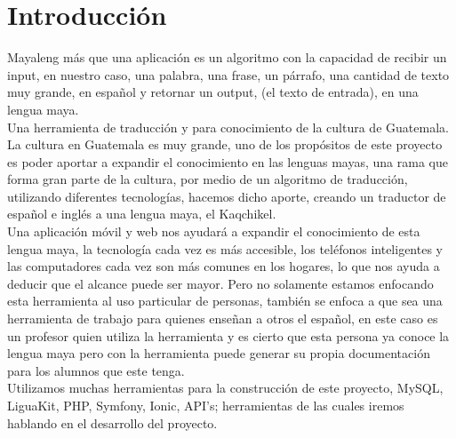 \documentclass[a4paper,openright,11pt]{article}
\begin{document}
\newpage

\tableofcontents

\cleardoublepage
\listoffigures

\cleardoublepage
\listoftables

\newpage

\pagestyle{fancy}
\section{Introducción}
Mayaleng más que una aplicación es un algoritmo con la capacidad de recibir un input, en nuestro caso, una palabra, una frase, un párrafo, una cantidad de texto muy grande, en español y retornar un output, (el texto de entrada), en una lengua maya. \\

Una herramienta de traducción y para conocimiento de la cultura de Guatemala.\\

La cultura en Guatemala es muy grande, uno de los propósitos de este proyecto es poder aportar a expandir el conocimiento en las lenguas mayas, una rama que forma gran parte de la cultura, por medio de un algoritmo de traducción, utilizando diferentes tecnologías, hacemos dicho aporte, creando un traductor de español e inglés a una lengua maya, el Kaqchikel.\\

Una aplicación móvil y web nos ayudará a expandir el conocimiento de esta lengua maya, la tecnología cada vez es más accesible, los teléfonos inteligentes y las computadores cada vez son más comunes en los hogares, lo que nos ayuda a deducir que el alcance puede ser mayor. Pero no solamente estamos enfocando esta herramienta al uso particular de personas, también se enfoca a que sea una herramienta de trabajo para quienes enseñan a otros el español, en este caso es un profesor quien utiliza la herramienta y es cierto que esta persona ya conoce la lengua maya pero con la herramienta puede generar su propia documentación para los alumnos que este tenga.\\

Utilizamos muchas herramientas para la construcción de este proyecto, MySQL, LiguaKit, PHP, Symfony, Ionic, API's; herramientas de las cuales iremos hablando en el desarrollo del proyecto.
\newpage
\end{document}
